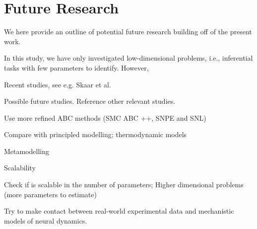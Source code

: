 



\chapter{Future Research}\label{chap:future}


We here provide an outline of potential future research building off of the present work.  

In this study, we have only investigated low-dimensional problems, i.e., inferential tasks with few parameters to identify. However, 

Recent studies, see e.g. Skaar et al. 


Possible future studies. Reference other relevant studies. 

Use more refined ABC methods
(SMC ABC ++, SNPE and SNL)

Compare with principled modelling; thermodynamic models

Metamodelling

Scalability 

Check if is scalable in the number of parameters;
Higher dimensional problems (more parameters to estimate)

Try to make contact between real-world experimental data and mechanistic models of neural dynamics. 
